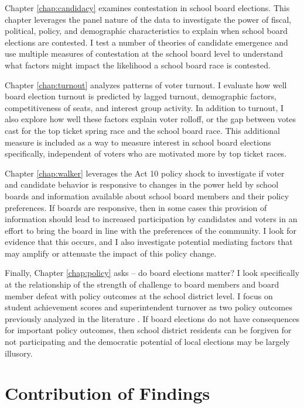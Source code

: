 Chapter \ref{chap:candidacy} examines contestation in school board elections. This 
chapter leverages the panel nature of the data to investigate the power 
of fiscal, political, policy, and demographic characteristics to explain when 
school board elections are contested. I test a number of theories of candidate 
emergence and use multiple measures of contestation at the school board level 
to understand what factors might impact the likelihood a school board race is 
contested. 

Chapter \ref{chap:turnout} analyzes patterns of voter turnout. I evaluate how well 
board election turnout is predicted by lagged turnout, demographic factors, 
competitiveness of seats, and interest group activity. In addition to turnout, 
I also explore how well these factors explain voter rolloff, or the gap between 
votes cast for the top ticket spring race and the school board race. This additional 
measure is included as a way to measure interest in school board elections 
specifically, independent of voters who are motivated more by top ticket races. 

Chapter \ref{chap:walker} leverages the Act 10 policy shock to investigate if 
voter and candidate behavior is responsive to changes in the power held by 
school boards and information available about school board members and their 
policy preferences. If boards are responsive, then in some cases this provision 
of information should lead to increased participation by candidates and voters 
in an effort to bring the board in line with the preferences of the community. 
I look for evidence that this occurs, and I also investigate potential mediating 
factors that may amplify or attenuate the impact of this policy change. 

Finally, Chapter \ref{chap:policy} asks -- do board elections matter? I look 
specifically at the relationship of the strength of challenge to board 
members and board member defeat with policy outcomes at the school district level. 
I focus on student achievement scores and superintendent turnover as two policy 
outcomes previously analyzed in the literature \citep{RefWorks:345,RefWorks:247}. 
If board elections do not have consequences for important policy outcomes, then 
school district residents can be forgiven for not participating and the democratic 
potential of local elections may be largely illusory. 


\section{Contribution of Findings}

